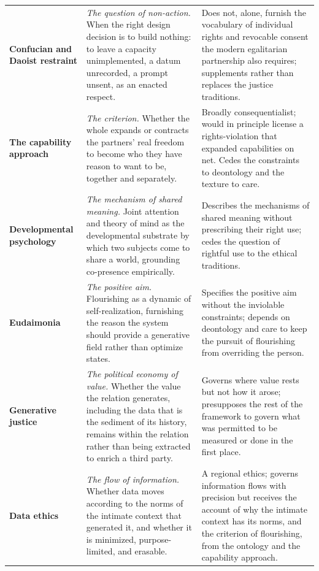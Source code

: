 \documentclass[11pt,a4paper]{article}
\begin{document}
\begin{small}
\begin{longtable}{@{}>{\raggedright\arraybackslash}p{} >{\raggedright\arraybackslash}p{} >{\raggedright\arraybackslash}p{}@{}}
\textbf{Confucian and Daoist restraint} \parencite{ames2011confucian, tu1985confucian} & \emph{The question of non-action.} When the right design decision is to build nothing: to leave a capacity unimplemented, a datum unrecorded, a prompt unsent, as an enacted respect. & Does not, alone, furnish the vocabulary of individual rights and revocable consent the modern egalitarian partnership also requires; supplements rather than replaces the justice traditions.\\

\textbf{The capability approach} \parencite{sen1999development, nussbaum2000women} & \emph{The criterion.} Whether the whole expands or contracts the partners' real freedom to become who they have reason to want to be, together and separately. & Broadly consequentialist; would in principle license a rights-violation that expanded capabilities on net. Cedes the constraints to deontology and the texture to care.\\

\textbf{Developmental psychology} \parencite{tomasello1999cultural, premack1978does} & \emph{The mechanism of shared meaning.} Joint attention and theory of mind as the developmental substrate by which two subjects come to share a world, grounding co-presence empirically. & Describes the mechanisms of shared meaning without prescribing their right use; cedes the question of rightful use to the ethical traditions.\\

\textbf{Eudaimonia} \parencite{ryff1995structure} & \emph{The positive aim.} Flourishing as a dynamic of self-realization, furnishing the reason the system should provide a generative field rather than optimize states. & Specifies the positive aim without the inviolable constraints; depends on deontology and care to keep the pursuit of flourishing from overriding the person.\\

\textbf{Generative justice} \parencite{eglash2016generative, marx1867capital} & \emph{The political economy of value.} Whether the value the relation generates, including the data that is the sediment of its history, remains within the relation rather than being extracted to enrich a third party. & Governs where value rests but not how it arose; presupposes the rest of the framework to govern what was permitted to be measured or done in the first place.\\

\textbf{Data ethics} \parencite{nissenbaum2010privacy} & \emph{The flow of information.} Whether data moves according to the norms of the intimate context that generated it, and whether it is minimized, purpose-limited, and erasable. & A regional ethics; governs information flows with precision but receives the account of why the intimate context has its norms, and the criterion of flourishing, from the ontology and the capability approach.\\


\end{longtable}
\end{small}
\end{document}
